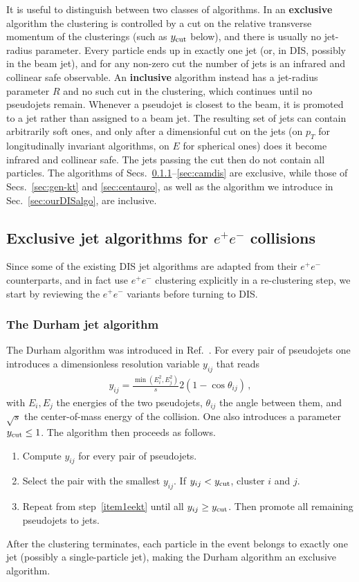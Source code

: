 It is useful to distinguish between two classes of algorithms.
%
In an \textbf{exclusive} algorithm the clustering is controlled by a
cut on the relative transverse momentum of the clusterings (such as
$y_{\rm cut}$ below), and there is usually no jet-radius parameter.
Every particle ends up in exactly one jet (or, in DIS, possibly in the
beam jet), and for any non-zero cut the number of jets is an infrared
and collinear safe observable.
%
An \textbf{inclusive} algorithm instead has a jet-radius parameter $R$
and no such cut in the clustering, which continues until no pseudojets
remain. Whenever a pseudojet is closest to the beam, it is promoted to
a jet rather than assigned to a beam jet. The resulting set of jets
can contain arbitrarily soft ones, and only after a dimensionful cut on
the jets (on $p_T$ for longitudinally invariant algorithms, on $E$ for
spherical ones) does it become infrared and collinear safe. The jets
passing the cut then do not contain all particles.
%
The algorithms of Secs.~\ref{sec:dum-ee}--\ref{sec:camdis} are
exclusive, while those of Secs.~\ref{sec:gen-kt} and
\ref{sec:centauro}, as well as the algorithm we introduce in
Sec.~\ref{sec:ourDISalgo}, are inclusive.

\subsection{Exclusive jet algorithms for  $e^+e^-$ collisions}
Since some of the existing DIS jet algorithms are adapted from their $e^+e^-$ counterparts, and in fact use  $e^+e^-$ clustering explicitly in a re-clustering step, we start by reviewing the $e^+e^-$ variants before turning to DIS.
\subsubsection{The Durham jet algorithm}
\label{sec:dum-ee}
%
The Durham algorithm was introduced in Ref.~\cite{Catani:1991hj,Brown:1991hx}. 
%
For every pair of pseudojets one introduces a dimensionless resolution variable $y_{ij}$ that reads
\begin{align}
	y_{i j} = \frac{\min (E_i^{2}, E_j^{2})}{s} 2(1 - \cos \theta_{i j})\,,
\end{align}
with $E_i, E_j$ the energies of the two pseudojets, $\theta_{ij}$ the angle between them, and $\sqrt{s}$ the center-of-mass energy of the collision.
%
One also introduces a parameter $y_{\rm cut} \leq 1$.
%
The algorithm then proceeds as follows. 
\begin{enumerate}
	\item \label{item1eekt} Compute $y_{ij}$ for every pair of pseudojets.
	\item Select the pair with the smallest $y_{ij}$. If
          $y_{ij}<y_{\rm cut}$, cluster $i$ and $j$.
	\item Repeat from step~\ref{item1eekt} until all $y_{ij} \geq
          y_{\rm cut}$. Then promote all remaining pseudojets to jets.
\end{enumerate}
After the clustering terminates, each particle in the event belongs to exactly one jet (possibly a single-particle jet), making the Durham algorithm an exclusive algorithm. 
